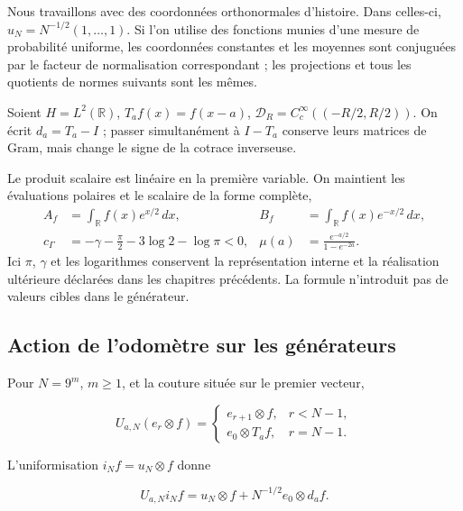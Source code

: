 Nous travaillons avec des coordonnées orthonormales d'histoire. Dans celles-ci, \(u_N=N^{-1/2}(1,\ldots,1)\). Si l'on utilise des fonctions munies d'une mesure de probabilité uniforme, les coordonnées constantes et les moyennes sont conjuguées par le facteur de normalisation correspondant ; les projections et tous les quotients de normes suivants sont les mêmes.

Soient \(H=L^2(\mathbb R)\), \(T_af(x)=f(x-a)\), \(\mathcal D_R=C_c^\infty((-R/2,R/2))\). On écrit \(d_a=T_a-I\) ; passer simultanément à \(I-T_a\) conserve leurs matrices de Gram, mais change le signe de la cotrace inverseuse.

Le produit scalaire est linéaire en la première variable. On maintient les évaluations polaires et le scalaire de la forme complète,
\begin{equation}
\begin{aligned}
A_f&=\int_{\mathbb R}f(x)e^{x/2}\,dx,
&B_f&=\int_{\mathbb R}f(x)e^{-x/2}\,dx,\\
c_\Gamma&=-\gamma-\frac\pi2-3\log2-\log\pi<0,
&\mu(a)&=\frac{e^{-a/2}}{1-e^{-2a}}.
\end{aligned}
\label{gamma-add-def-evaluaciones}
\end{equation}
Ici \(\pi\), \(\gamma\) et les logarithmes conservent la représentation interne et la réalisation ultérieure déclarées dans les chapitres précédents. La formule n'introduit pas de valeurs cibles dans le générateur.

\subsection{Action de l'odomètre sur les générateurs}
\label{gamma-add-sub-47}

Pour \(N=9^m\), \(m\ge1\), et la couture située sur le premier vecteur,

\begin{equation}
U_{a,N}(e_r\otimes f)=
\begin{cases}
e_{r+1}\otimes f,&r<N-1,\\
e_0\otimes T_af,&r=N-1.
\end{cases}
\label{gamma-add-display-1}
\end{equation}

L'uniformisation \(i_Nf=u_N\otimes f\) donne

\begin{equation}
U_{a,N}i_Nf
=u_N\otimes f+N^{-1/2}e_0\otimes d_af.
\label{gamma-add-display-2}
\end{equation}

